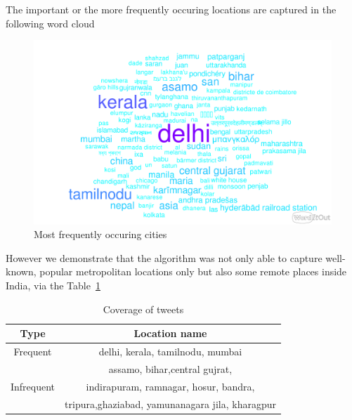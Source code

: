 \documentclass[journal, a4paper]{IEEEtran}
\begin{document}
The important or the more frequently occuring locations are captured in the following word cloud
\begin{figure}[h]
	\begin{center}
		\includegraphics[scale=0.23]{wc}
		\caption{Most frequently occuring cities}
		\label{fig:word_cloud}
	\end{center}
\end{figure}
However we demonstrate that the algorithm was not only able to capture well-known, popular metropolitan locations only but also some remote places inside India, via the Table~\ref{tab:Location}
	\begin{table}[!hbt]
		\begin{center}
			\caption{Coverage of tweets}
			\label{tab:Location}
			\begin{tabular}{|c|c|}
				\hline
				Type&Location name\\\hline
				
				Frequent& delhi, kerala, tamilnodu, mumbai
				\\
				& assamo, bihar,central gujrat, \\\hline
				Infrequent& indirapuram, ramnagar, hosur, bandra,
				\\
				& tripura,ghaziabad, yamunanagara jila, kharagpur \\
				
				\hline
				
				\hline
			\end{tabular}
		\end{center}
	\end{table}
\end{document}
